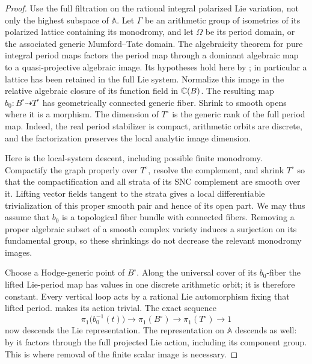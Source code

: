 \begin{proof}
Use the full filtration on the rational integral polarized Lie
variation, not only the highest subspace of $\mathbb A$.  Let
$\Gamma$ be an arithmetic group of isometries of its polarized
lattice containing its monodromy, and let $\Omega$ be its period
domain, or the associated generic Mumford--Tate domain.
The algebraicity theorem for pure integral period maps
\cite[Theorem~1.1]{BBT} factors the period map through a
dominant algebraic map to a quasi-projective algebraic image.
Its hypotheses hold here by ; in
particular a lattice has been retained in the full Lie system.
Normalize this image in the relative algebraic closure of its
function field in $\mathbb C(B)$.  The resulting map
$b_0:B^\circ\dashrightarrow T^\circ$ has geometrically connected
generic fiber.  Shrink to smooth opens where it is a morphism.
The dimension of $T^\circ$ is the generic rank of the full
period map.  Indeed, the real period stabilizer is compact,
arithmetic orbits are discrete, and the factorization preserves
the local analytic image dimension.

Here is the local-system descent, including possible finite
monodromy.  Compactify the graph properly over $T^\circ$, resolve
the complement, and shrink $T^\circ$ so that the compactification
and all strata of its SNC complement are smooth over it.
Lifting vector fields tangent to the strata gives a local
differentiable trivialization of this proper smooth pair and
hence of its open part.  We may thus assume that $b_0$ is a
topological fiber bundle with connected fibers.  Removing a
proper algebraic subset of a smooth complex variety induces a
surjection on its fundamental group, so these shrinkings do not
decrease the relevant monodromy images.

Choose a Hodge-generic point of $B^\circ$.  Along the universal
cover of its $b_0$-fiber the lifted Lie-period map has values in
one discrete arithmetic orbit; it is therefore constant.
Every vertical loop acts by a rational Lie automorphism fixing
that lifted period.   makes its
action trivial.  The exact sequence
\[
 \pi_1\bigl(b_0^{-1}(t)\bigr)\longrightarrow
 \pi_1(B^\circ)\longrightarrow\pi_1(T^\circ)
 \longrightarrow1
\]
now descends the Lie representation.  The representation on
$\mathbb A$ descends as well: by
 it factors through the full
projected Lie action, including its component group.  This is
where removal of the finite scalar image is necessary.


\end{proof}
